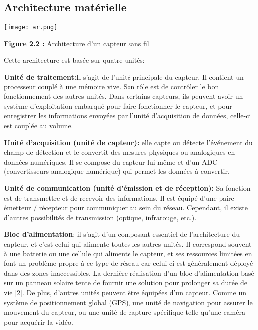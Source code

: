 \documentclass[paper=a4, fontsize=11pt]{scrartcl}
\numberwithin{equation}{section}		%
\numberwithin{figure}{section}			%
\numberwithin{table}{section}				%
\begin{document}
\subsection{ Architecture matérielle}
\begin{center}
    \texttt{[image: ar.png]} \par
    \caption{  \textbf{Figure 2.2 :} Architecture d'un capteur sans fil } \par
    \end{center}
Cette architecture est basée sur quatre unités:\par
\textbf{Unité de traitement:}Il s'agit de l'unité principale du capteur. Il contient un
processeur couplé à une mémoire vive. Son rôle est de contrôler le bon
fonctionnement des autres unités. Dans certains capteurs, ils peuvent avoir un
système d'exploitation embarqué pour faire fonctionner le capteur, et pour
enregistrer les informations envoyées par l'unité d'acquisition de données, celle-ci
est couplée au volume.\par
\textbf{ Unité d'acquisition (unité de capteur):} elle capte ou détecte l'événement du champ
de détection et le convertit des mesures physiques ou analogiques en données
numériques. Il se compose du capteur lui-même et d'un ADC (convertisseurs
analogique-numérique) qui permet les données à convertir.\par
\textbf{ Unité de communication (unité d'émission et de réception):} Sa fonction est de
transmettre et de recevoir des informations. Il est équipé d'une paire émetteur /
récepteur pour communiquer au sein du réseau. Cependant, il existe d'autres
possibilités de transmission (optique, infrarouge, etc.).\par
 \textbf{Bloc d'alimentation}: il s'agit d'un composant essentiel de l'architecture du
capteur, et c'est celui qui alimente toutes les autres unités. Il correspond souvent à
une batterie ou une cellule qui alimente le capteur, et ses ressources limitées en font
un problème propre à ce type de réseau car celui-ci est généralement déployé dans
des zones inaccessibles.
La dernière réalisation d'un bloc d'alimentation basé sur un panneau solaire tente de
fournir une solution pour prolonger sa durée de vie [2].
De plus, d'autres unités peuvent être équipées d'un capteur. Comme un système de
positionnement global (GPS), une unité de navigation pour assurer le mouvement du
capteur, ou une unité de capture spécifique telle qu'une caméra pour acquérir la
vidéo.\par
\end{document}
